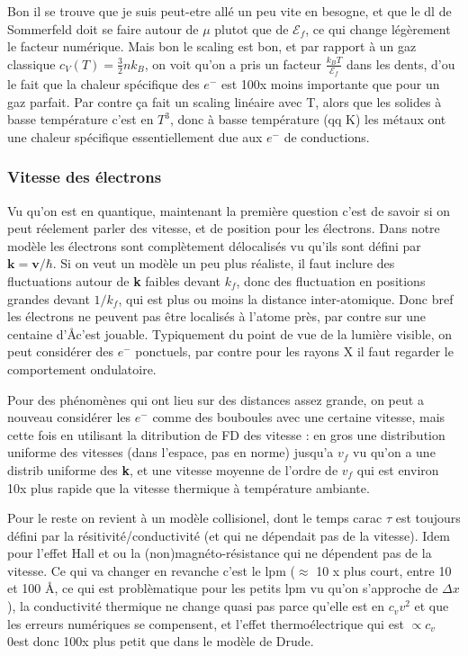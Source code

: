 \documentclass[a4paper]{report}
\begin{document}
  Bon il se trouve que je suis peut-etre allé un peu vite en besogne, et que le dl de Sommerfeld doit se faire autour de $\mu$ plutot que de $\mathcal{E}_f$, ce qui change légèrement le facteur numérique. Mais bon le scaling est bon, et par rapport à un gaz classique $c_V(T)=\frac{3}{2}nk_B$, on voit qu'on a pris un facteur $\frac{k_BT}{\mathcal{E}_f}$ dans les dents, d'ou le fait que la chaleur spécifique des $e^-$ est 100x moins importante que pour un gaz parfait. Par contre ça fait un scaling linéaire avec T, alors que les solides à basse température c'est en $T^3$, donc à basse température (qq K) les métaux ont une chaleur spécifique essentiellement due aux $e^-$ de conductions.
  
  \subsubsection{Vitesse des électrons}
  Vu qu'on est en quantique, maintenant la première question c'est de savoir si on peut réelement parler des vitesse, et de position pour les électrons. Dans notre modèle les électrons sont complètement délocalisés vu qu'ils sont défini par $\mathbf{k}=\mathbf{v}/\hbar$. Si on veut un modèle un peu plus réaliste, il faut inclure des fluctuations autour de \textbf{k} faibles devant $k_f$, donc des fluctuation en positions grandes devant $1/k_f$, qui est plus ou moins la distance inter-atomique. Donc bref les électrons ne peuvent pas être localisés à l'atome près, par contre sur une centaine d'\AA  c'est jouable. Typiquement du point de vue de la lumière visible, on peut considérer des $e^-$ ponctuels, par contre pour les rayons X il faut regarder le comportement ondulatoire.
  
  Pour des phénomènes qui ont lieu sur des distances assez grande, on peut a nouveau considérer les $e^-$ comme des bouboules avec une certaine vitesse, mais cette fois en utilisant la ditribution de FD des vitesse : en gros une distribution uniforme des vitesses (dans l'espace, pas en norme) jusqu'a $v_f$ vu qu'on a une distrib uniforme des \textbf{k}, et une vitesse moyenne de l'ordre de $v_f$ qui est environ 10x plus rapide que la vitesse thermique à température ambiante.
  
  Pour le reste on revient à un modèle collisionel, dont le temps carac $\tau$ est toujours défini par la résitivité/conductivité (et qui ne dépendait pas de la vitesse). Idem pour l'effet Hall et ou la (non)magnéto-résistance qui ne dépendent pas de la vitesse. Ce qui va changer en revanche c'est le lpm ($\approx$ 10 x plus court, entre 10 et 100 \AA , ce qui est problèmatique pour les petits lpm vu qu'on s'approche de $\Delta x$), la conductivité thermique ne change quasi pas parce qu'elle est en $c_v v^2$ et que les erreurs numériques se compensent, et l'effet thermoélectrique qui est $\propto c_v$ 0est donc 100x plus petit que dans le modèle de Drude.
  
\end{document}
